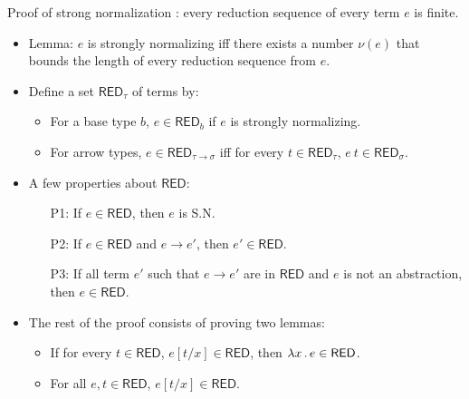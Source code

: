 \documentclass[paper=screen,mode=present,style=zysimple]{powerdot}
\newcommand{\RED}{\mathsf{RED}}
\begin{document}
\begin{slide}{Proof of strong normalization}
: every reduction sequence of every term $e$ is finite.
\vspace*{-0.5em}
\begin{itemize}
\item Lemma: $e$ is strongly normalizing iff there exists a number $\nu(e)$ that bounds the length of 
  every reduction sequence from $e$.
\vspace*{-0.3em}
\item Define a  set $\RED_\tau$ of terms by:
\vspace*{-0.5em}
\begin{itemize}
\item For a base type $b$, $e \in \RED_b$ if $e$ is strongly normalizing.
\item For arrow types, $e \in \RED_{\tau \to \sigma}$ iff for every $t \in \RED_\tau$, $e\ t \in \RED_\sigma$.
\vspace*{-0.5em}
\end{itemize}
\item A few properties about $\RED$:
\vspace*{-0.5em}
\begin{itemize}
\item[P1:] If $e \in \RED$, then $e$ is S.N.
\item[P2:] If $e \in \RED$ and $e \to e'$, then $e' \in \RED$.
\item[P3:] If all term $e'$ such that $e \to e'$ are in $\RED$ and $e$ is not an abstraction, 
  then $e \in \RED$.
\vspace*{-0.5em}
\end{itemize}
\item The rest of the proof consists of proving two lemmas:
\vspace*{-0.5em}
\begin{itemize}
\item If for every $t \in \RED$, $e[t / x] \in \RED$, then $\lambda x \ldot e \in \RED$.
\item For all $e, t \in \RED$, $e[t / x] \in \RED$.
\end{itemize}
\end{itemize}
\end{slide}
\end{document}
